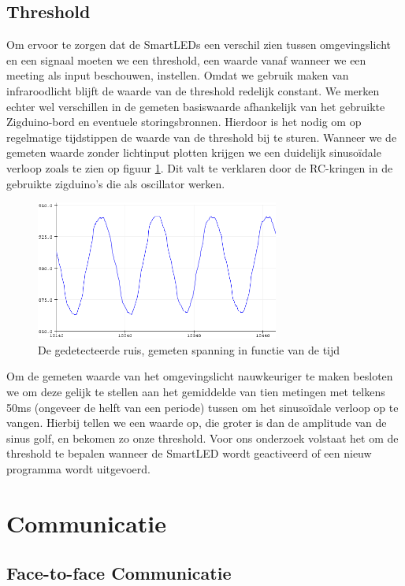 \documentclass{article}
\begin{document}
\subsection{Threshold}

Om ervoor te zorgen dat de SmartLEDs een verschil zien tussen omgevingslicht en een signaal moeten we een threshold, een waarde vanaf wanneer we een meeting als input beschouwen, instellen. Omdat we gebruik maken van infraroodlicht blijft de waarde van de threshold redelijk constant. We merken echter wel verschillen in de gemeten basiswaarde afhankelijk van het gebruikte Zigduino-bord en eventuele storingsbronnen. Hierdoor is het nodig om op regelmatige tijdstippen de waarde van de threshold bij te sturen. 
Wanneer we de gemeten waarde zonder lichtinput plotten krijgen we een duidelijk sinusoïdale verloop zoals te zien op figuur \ref{fig:ruis}. Dit valt te verklaren door de RC-kringen in de gebruikte zigduino’s die als oscillator werken. \cite{oscillator}  

\begin{figure}[H]
\centering
\includegraphics[width=8cm]{ruis.png}
\caption{De gedetecteerde ruis, gemeten spanning in functie van de tijd}
\label{fig:ruis}
\end{figure}

Om de gemeten waarde van het omgevingslicht nauwkeuriger te maken besloten we om deze gelijk te stellen aan het gemiddelde van tien metingen met telkens 50ms (ongeveer de helft van een periode) tussen om het sinuso\"idale verloop op te vangen. Hierbij tellen we een waarde op, die groter is dan de amplitude van de sinus golf, en bekomen zo onze threshold. 
Voor ons onderzoek volstaat het om de threshold te bepalen wanneer de SmartLED wordt geactiveerd of een nieuw programma wordt uitgevoerd.

\section{Communicatie}\label{communicatie}
\subsection{Face-to-face Communicatie}
\end{document}
